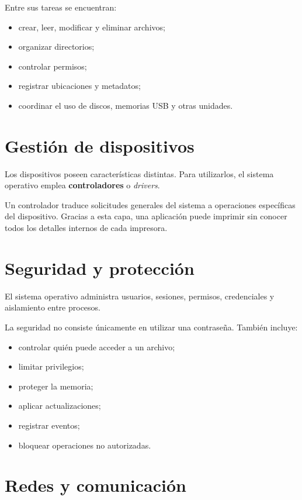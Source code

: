\documentclass[
  spanish,
  letterpaper,
]{scrbook}
\providecommand{\tightlist}{%
  \setlength{\itemsep}{0pt}\setlength{\parskip}{0pt}}
\begin{document}
Entre sus tareas se encuentran:

\begin{itemize}
\tightlist
\item
  crear, leer, modificar y eliminar archivos;
\item
  organizar directorios;
\item
  controlar permisos;
\item
  registrar ubicaciones y metadatos;
\item
  coordinar el uso de discos, memorias USB y otras unidades.
\end{itemize}

\section{Gestión de dispositivos}\label{gestiuxf3n-de-dispositivos}

Los dispositivos poseen características distintas. Para utilizarlos, el
sistema operativo emplea \textbf{controladores} o \emph{drivers}.

Un controlador traduce solicitudes generales del sistema a operaciones
específicas del dispositivo. Gracias a esta capa, una aplicación puede
imprimir sin conocer todos los detalles internos de cada impresora.

\section{Seguridad y protección}\label{seguridad-y-protecciuxf3n}

El sistema operativo administra usuarios, sesiones, permisos,
credenciales y aislamiento entre procesos.

La seguridad no consiste únicamente en utilizar una contraseña. También
incluye:

\begin{itemize}
\tightlist
\item
  controlar quién puede acceder a un archivo;
\item
  limitar privilegios;
\item
  proteger la memoria;
\item
  aplicar actualizaciones;
\item
  registrar eventos;
\item
  bloquear operaciones no autorizadas.
\end{itemize}

\section{Redes y comunicación}\label{redes-y-comunicaciuxf3n}
\end{document}
